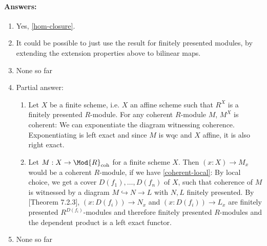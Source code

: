 \paragraph{Answers:}
\begin{enumerate}
\item Yes, \cref{hom-closure}.
\item It could be possible to just use the result for finitely presented modules, by extending the extension properties above to bilinear maps.
\item None so far
\item Partial answer:
\begin{enumerate}
\item Let $X$ be a finite scheme, i.e. $X$ an affine scheme such that $R^X$ is a finitely presented $R$-module.
  For any coherent $R$-module $M$, $M^X$ is coherent: We can exponentiate the diagram witnessing coherence.
  Exponentiating is left exact and since $M$ is wqc and $X$ affine, it is also right exact.
\item Let $M:X\to \Mod{R}_{\mathrm{coh}}$ for a finite scheme $X$. Then $(x:X)\to M_x$ would be a coherent $R$-module, if we have \cref{coherent-local}: By local choice, we get a cover $D(f_1),\dots,D(f_n)$ of $X$, such that coherence of $M$ is witnessed by a diagram $M\hookrightarrow N \to L$ with $N,L$ finitely presented. By \cite{draft}[Theorem 7.2.3], $(x:D(f_i))\to N_x$ and $(x:D(f_i))\to L_x$ are finitely presented $R^{D(f_i)}$-modules and therefore finitely presented $R$-modules and the dependent product is a left exact functor.
\end{enumerate}
\item None so far
\end{enumerate}
